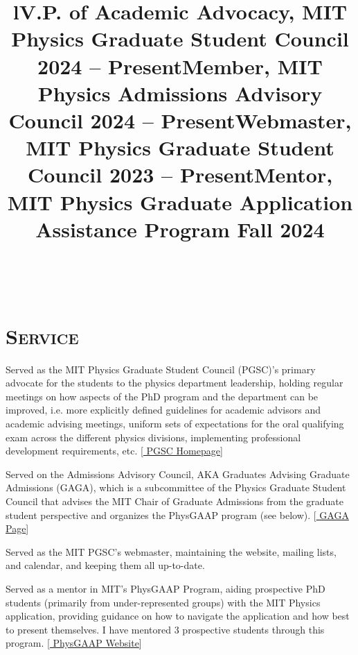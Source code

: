 \documentclass[marg, centered]{res}
\begin{document}
\begin{resume}
\begin{format}
\title{l} \\
\body
\end{format}

\section{{\scshape \bfseries Service}}

\title{\textbf{V.P. of Academic Advocacy}, MIT Physics Graduate Student Council \hfill \textbf{2024 -- Present}}
\begin{position}
{\small Served as the MIT Physics Graduate Student Council (PGSC)'s primary advocate for the students to the physics department leadership, holding regular meetings on how aspects of the PhD program and the department can be improved, i.e. more explicitly defined guidelines for academic advisors and academic advising meetings, uniform sets of expectations for the oral qualifying exam across the different physics divisions, implementing professional development requirements, etc. [\href{https://physics-gsc.scripts.mit.edu/home/}{\color{dkbu} PGSC Homepage}]}
\end{position}

\title{\textbf{Member}, MIT Physics Admissions Advisory Council \hfill \textbf{2024 -- Present}}
\begin{position}
{\small Served on the Admissions Advisory Council, AKA Graduates Advising Graduate Admissions (GAGA), which is a subcommittee of the Physics Graduate Student Council that advises the MIT Chair of Graduate Admissions from the graduate student perspective and organizes the PhysGAAP program (see below). [\href{https://physics-gsc.scripts.mit.edu/home/gaga/}{\color{dkbu} GAGA Page}]}
\end{position}

\title{\textbf{Webmaster}, MIT Physics Graduate Student Council \hfill \textbf{2023 -- Present}}
\begin{position}
{\small Served as the MIT PGSC's webmaster, maintaining the website, mailing lists, and calendar, and keeping them all up-to-date.}
\end{position}

\title{\textbf{Mentor}, MIT Physics Graduate Application Assistance Program \hfill \textbf{Fall 2024}}
\begin{position}
{\small Served as a mentor in MIT's PhysGAAP Program, aiding prospective PhD students (primarily from under-represented groups) with the MIT Physics application, providing guidance on how to navigate the application and how best to present themselves.  I have mentored 3 prospective students through this program. [\href{https://sites.mit.edu/physgaap/}{\color{dkbu} PhysGAAP Website}]}
\end{position}


\end{resume}
\end{document}

